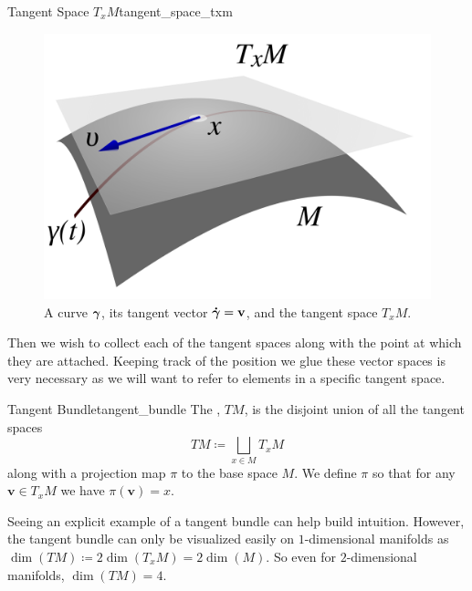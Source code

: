 
\begin{fig}{Tangent Space $T_xM$}{tangent_space_txm}
\begin{figure}[H]
    \centering
    \includegraphics[width=.4\textwidth]{TACA_2019/tangent_space.png}
    \caption{A curve $\boldsymbol{\gamma}$, its tangent vector $\boldsymbol{\dot{\gamma}}=\mathbf{v}$, and the tangent space $T_xM$.}
    \label{fig:tangent_space}
\end{figure}
\end{fig}

Then we wish to collect each of the tangent spaces along with the point at which they are attached.  Keeping track of the position we glue these vector spaces is very necessary as we will want to refer to elements in a specific tangent space.

\begin{df}{Tangent Bundle}{tangent_bundle}
The , $TM$, is the disjoint union of all the tangent spaces
\[
TM\coloneqq \bigsqcup_{x\in M} T_xM
\]
along with a projection map $\pi$ to the base space $M$.  We define $\pi$ so that for any $\mathbf{v}\in T_xM$ we have $\pi(\mathbf{v})=x$. 
\end{df}

Seeing an explicit example of a tangent bundle can help build intuition.  However, the tangent bundle can only be visualized easily on $1$-dimensional manifolds as $\dim(TM)\coloneqq 2\dim(T_xM)=2\dim(M)$. So even for $2$-dimensional manifolds, $\dim(TM)=4$. 

